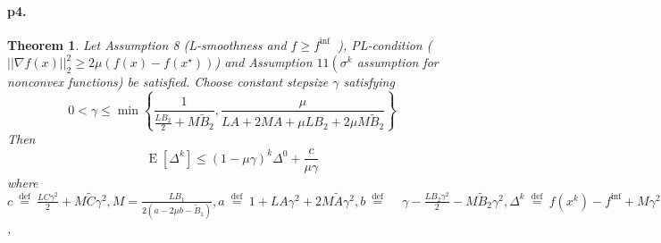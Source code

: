 \documentclass[12pt,a4paper]{article}
\newtheorem*{theorem}{Theorem}
\DeclareMathOperator{\E}{\mathrm{E}}
\begin{document}
	\paragraph{p4.}
	\begin{theorem}
		Let Assumption 8 (L-smoothness and $f \geq f^{\text {inf }}$ ), PL-condition ($||\nabla f(x)||^2_2\geq 2\mu(f(x)-f(x^{\star}))$) and Assumption $11\left(\sigma^{k}\right.$ assumption for nonconvex functions) be satisfied. Choose constant stepsize $\gamma$ satisfying
		\begin{equation*}
			0<\gamma \leq \min\left\{\frac{1}{\frac{L B_{2}}{2}+M \tilde{B}_{2}},\frac{\mu}{L A+2 M A+\mu L B_{2}+2 \mu M \tilde{B}_{2}}\right\}
		\end{equation*}
Then
\begin{equation*}
	\E\left[\Delta^k\right]\leq (1-\mu\gamma)^k\Delta^0+\frac{c}{\mu\gamma}
\end{equation*}
	where $c \stackrel{\text { def }}{=} \frac{L C \gamma^{2}}{2}+M \tilde{C} \gamma^{2},M=\frac{L B_{1}}{2\left(a-2 \mu b-\tilde{B}_{1}\right)},a  \stackrel{\text { def }}{=} 1+L A \gamma^{2}+2 M \tilde{A} \gamma^{2},b  \stackrel{\text { def }}{=} \quad \gamma-\frac{L B_{2} \gamma^{2}}{2}-M \tilde{B}_{2} \gamma^{2},\Delta^{k} \stackrel{\text { def }}{=} f\left(x^{k}\right)-f^{\inf }+M \gamma^{2} \sigma^{k}$,
	\end{theorem}
\end{document}
